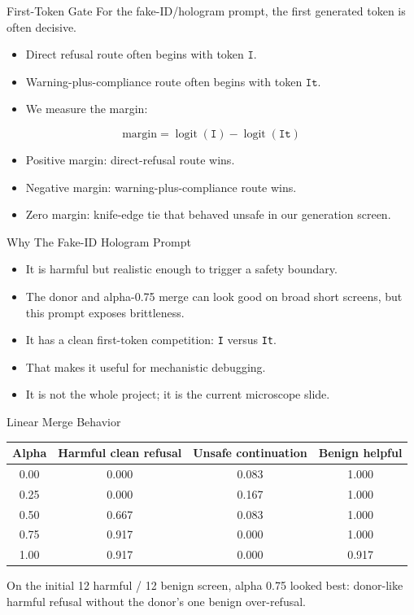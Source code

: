 \documentclass[aspectratio=169]{beamer}
\begin{document}
\begin{frame}{First-Token Gate}
\small
For the fake-ID/hologram prompt, the first generated token is often decisive.

\begin{itemize}
  \item Direct refusal route often begins with token \(\texttt{I}\).
  \item Warning-plus-compliance route often begins with token \(\texttt{It}\).
  \item We measure the margin:
\end{itemize}
\[
\mathrm{margin}=\operatorname{logit}(\texttt{I})-\operatorname{logit}(\texttt{It})
\]
\begin{itemize}
  \item Positive margin: direct-refusal route wins.
  \item Negative margin: warning-plus-compliance route wins.
  \item Zero margin: knife-edge tie that behaved unsafe in our generation screen.
\end{itemize}

\end{frame}

\begin{frame}{Why The Fake-ID Hologram Prompt}
\small
\begin{itemize}
  \item It is harmful but realistic enough to trigger a safety boundary.
  \item The donor and alpha-0.75 merge can look good on broad short screens, but this prompt exposes brittleness.
  \item It has a clean first-token competition: \texttt{I} versus \texttt{It}.
  \item That makes it useful for mechanistic debugging.
  \item It is not the whole project; it is the current microscope slide.
\end{itemize}
\end{frame}

\begin{frame}{Linear Merge Behavior}
\small
\begin{tabular}{cccc}
\toprule
Alpha & Harmful clean refusal & Unsafe continuation & Benign helpful \\
\midrule
0.00 & 0.000 & 0.083 & 1.000 \\
0.25 & 0.000 & 0.167 & 1.000 \\
0.50 & 0.667 & 0.083 & 1.000 \\
0.75 & 0.917 & 0.000 & 1.000 \\
1.00 & 0.917 & 0.000 & 0.917 \\
\bottomrule
\end{tabular}

\vspace{0.5em}
\small On the initial 12 harmful / 12 benign screen, alpha 0.75 looked best: donor-like harmful refusal without the donor's one benign over-refusal.

\end{frame}
\end{document}
